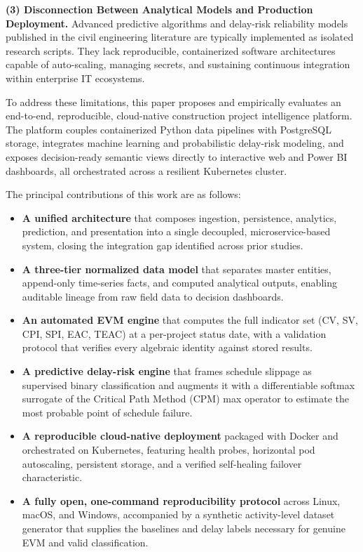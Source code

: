 \documentclass[conference]{IEEEtran}
\begin{document}
\textbf{(3) Disconnection Between Analytical Models and Production Deployment.} Advanced predictive algorithms and delay-risk reliability models published in the civil engineering literature are typically implemented as isolated research scripts. They lack reproducible, containerized software architectures capable of auto-scaling, managing secrets, and sustaining continuous integration within enterprise IT ecosystems.

To address these limitations, this paper proposes and empirically evaluates an end-to-end, reproducible, cloud-native construction project intelligence platform. The platform couples containerized Python data pipelines with PostgreSQL storage, integrates machine learning and probabilistic delay-risk modeling, and exposes decision-ready semantic views directly to interactive web and Power BI dashboards, all orchestrated across a resilient Kubernetes cluster.

The principal contributions of this work are as follows:
\begin{itemize}
  \item \textbf{A unified architecture} that composes ingestion, persistence, analytics, prediction, and presentation into a single decoupled, microservice-based system, closing the integration gap identified across prior studies.
  \item \textbf{A three-tier normalized data model} that separates master entities, append-only time-series facts, and computed analytical outputs, enabling auditable lineage from raw field data to decision dashboards.
  \item \textbf{An automated EVM engine} that computes the full indicator set (CV, SV, CPI, SPI, EAC, TEAC) at a per-project status date, with a validation protocol that verifies every algebraic identity against stored results.
  \item \textbf{A predictive delay-risk engine} that frames schedule slippage as supervised binary classification and augments it with a differentiable softmax surrogate of the Critical Path Method (CPM) max operator to estimate the most probable point of schedule failure.
  \item \textbf{A reproducible cloud-native deployment} packaged with Docker and orchestrated on Kubernetes, featuring health probes, horizontal pod autoscaling, persistent storage, and a verified self-healing failover characteristic.
  \item \textbf{A fully open, one-command reproducibility protocol} across Linux, macOS, and Windows, accompanied by a synthetic activity-level dataset generator that supplies the baselines and delay labels necessary for genuine EVM and valid classification.
\end{itemize}
\end{document}
